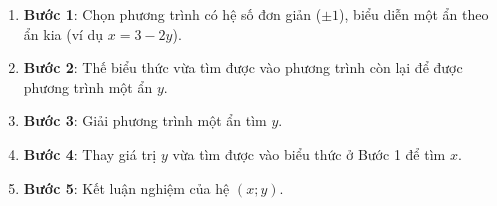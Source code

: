 \begin{enumerate}
\item \textbf{Bước 1}: Chọn phương trình có hệ số đơn giản ($\pm 1$), biểu diễn một ẩn theo ẩn kia (ví dụ $x = 3 - 2y$).
\item \textbf{Bước 2}: Thế biểu thức vừa tìm được vào phương trình còn lại để được phương trình một ẩn $y$.
\item \textbf{Bước 3}: Giải phương trình một ẩn tìm $y$.
\item \textbf{Bước 4}: Thay giá trị $y$ vừa tìm được vào biểu thức ở Bước 1 để tìm $x$.
\item \textbf{Bước 5}: Kết luận nghiệm của hệ $(x; y)$.
\end{enumerate}
